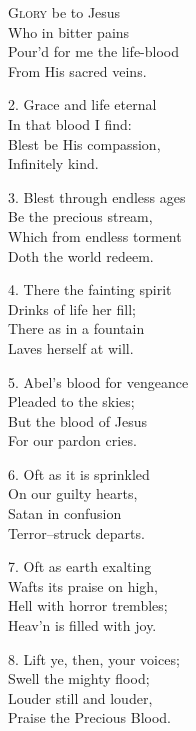 
\begin{minipage}[t]{0.5\textwidth}
\lettrine{G}{lory} be to Jesus\\
Who in bitter pains\\
Pour’d for me the life-blood\\
From His sacred veins.


\vskip3pt\hskip-3pt 2. Grace and life eternal\\
In that blood I find:\\
Blest be His compassion,\\
Infinitely kind.


\vskip3pt\hskip-3pt 3. Blest through endless ages\\
Be the precious stream,\\
Which from endless torment\\
Doth the world redeem.


\vskip3pt\hskip-3pt 4. There the fainting spirit\\
Drinks of life her fill;\\
There as in a fountain\\
Laves herself at will.
\end{minipage}
\hskip3pt
\begin{minipage}[t]{0.5\textwidth}
\hskip-3pt 5. Abel’s blood for vengeance\\
Pleaded to the skies;\\
But the blood of Jesus\\
For our pardon cries.


\vskip3pt\hskip-3pt 6. Oft as it is sprinkled\\
On our guilty hearts,\\
Satan in confusion\\
Terror–struck departs.


\vskip3pt\hskip-3pt 7. Oft as earth exalting\\
Wafts its praise on high,\\
Hell with horror trembles;\\
Heav’n is filled with joy.

\vskip3pt\hskip-3pt 8. Lift ye, then, your voices;\\
Swell the mighty flood;\\
Louder still and louder,\\
Praise the Precious Blood.
\end{minipage}

\medskip


